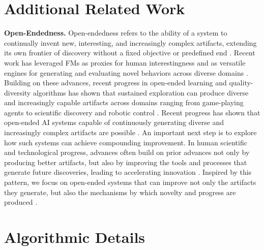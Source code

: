 
\section{Additional Related Work}
\label{app:related-work}

\textbf{Open-Endedness.}
Open-endedness refers to the ability of a system to continually invent new, interesting, and increasingly complex artifacts, extending its own frontier of discovery without a fixed objective or predefined end \citep{stanley2017open, hughes2024open}. Recent work has leveraged FMs as proxies for human interestingness and as versatile engines for generating and evaluating novel behaviors across diverse domains \citep{zhangomni, faldoromni}. Building on these advances, recent progress in open-ended learning \citep{huautomated, zoph2017neural, colas2023augmenting, lehman2023evolution} and quality-diversity algorithms \citep{lehman2011evolving, mouret2015illuminating, bradley2023quality, samvelyan2024rainbow, dingquality, pourcel2023aces, coiffard2025overcoming, dharna2025foundation, yuan2026agenticred} has shown that sustained exploration can produce diverse and increasingly capable artifacts across domains ranging from game-playing agents \citep{klissarov2023motif, klissarovmaestromotif, wangvoyager} to scientific discovery \citep{lu2024discovering, lu2024ai, romera2024mathematical, novikov2025alphaevolve, audran2025does} and robotic control \citep{cully2015robots, li2024auto, grillotti2025tabula}. Recent progress has shown that open-ended AI systems capable of continuously generating diverse and increasingly complex artifacts are possible \citep{zhangomni, faldoromni, huautomated}. An important next step is to explore how such systems can achieve compounding improvement. In human scientific and technological progress, advances often build on prior advances not only by producing better artifacts, but also by improving the tools and processes that generate future discoveries, leading to accelerating innovation \citep{good1966speculations, kwa2025measuring}. Inspired by this pattern, we focus on open-ended systems that can improve not only the artifacts they generate, but also the mechanisms by which novelty and progress are produced \citep{clune2019ai, jiang2023general}.

\section{Algorithmic Details}
\label{app:algo-details}

